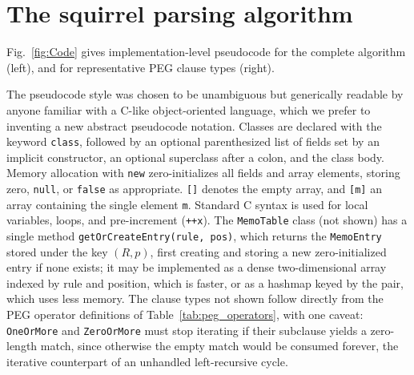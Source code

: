\documentclass[manuscript]{acmart}
\newcommand{\cd}[1]{\texttt{#1}}
\begin{document}
\section{The squirrel parsing algorithm}
\label{sec:algorithm}

Fig.~\ref{fig:Code} gives implementation-level pseudocode for the complete algorithm (left), and for representative PEG clause types (right).

The pseudocode style was chosen to be unambiguous but generically readable by anyone familiar with a C-like object-oriented language, which we prefer to inventing a new abstract pseudocode notation. Classes are declared with the keyword \cd{class}, followed by an optional parenthesized list of fields set by an implicit constructor, an optional superclass after a colon, and the class body. Memory allocation with \cd{new} zero-initializes all fields and array elements, storing zero, \cd{null}, or \cd{false} as appropriate. \cd{[]} denotes the empty array, and \cd{[m]} an array containing the single element \cd{m}. Standard C syntax is used for local variables, loops, and pre-increment (\cd{++x}). The \cd{MemoTable} class (not shown) has a single method \cd{getOrCreateEntry(rule, pos)}, which returns the \cd{MemoEntry} stored under the key $(R, p)$, first creating and storing a new zero-initialized entry if none exists; it may be implemented as a dense two-dimensional array indexed by rule and position, which is faster, or as a hashmap keyed by the pair, which uses less memory. The clause types not shown follow directly from the PEG operator definitions of Table~\ref{tab:peg_operators}, with one caveat: \cd{OneOrMore} and \cd{ZeroOrMore} must stop iterating if their subclause yields a zero-length match, since otherwise the empty match would be consumed forever, the iterative counterpart of an unhandled left-recursive cycle.
\end{document}
